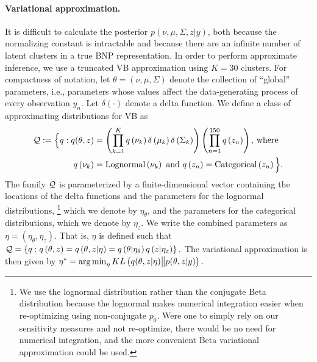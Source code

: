 %
\paragraph{Variational approximation.} It is difficult to calculate the
posterior $p\left(\nu, \mu, \Sigma, z \vert y\right)$, both because the
normalizing constant is intractable and because there are an infinite number of
latent clusters in a true BNP representation. In order to perform approximate
inference, we use a truncated VB approximation using $K=30$
clusters\citep{blei:2006:dirichletbnp}. For compactness of notation, let $\theta =
\left(\nu, \mu, \Sigma\right)$ denote the collection of ``global'' parameters,
i.e., parameters whose values affect the data-generating process of every
observation $y_n$.   Let $\delta\left(\cdot\right)$ denote a delta function. We
define a class of approximating distributions for VB as
%
\begin{align*}
\mathcal{Q} := \Big\{ q:
q(\theta, z) &=
\left(\prod_{k=1}^{K}q\left(\nu_{k}\right)\delta\left(\mu_{k}\right)
    \delta\left(\Sigma_{k}\right)\right)
    \left(\prod_{n=1}^{150}q\left(z_{n}\right) \right)\textrm{, where } \\
q\left(\nu_{k}\right) &= \mathrm{Lognormal}\left(\nu_k\right) \textrm{ and }
q\left(z_n\right) = \mathrm{Categorical}\left(z_n\right)
\Big\}.
\end{align*}
%
The family $\mathcal{Q}$ is parameterized by a finite-dimensional vector containing
the locations of the delta functions and the parameters for the lognormal
distributions,
%
\footnote{We use the lognormal distribution rather than the conjugate Beta
distribution because the lognormal makes numerical integration easier when
re-optimizing using non-conjugate $p_{0}$.  Were one to simply rely on our
sensitivity measures and not re-optimize, there would be no need for numerical
integration, and the more convenient Beta variational approximation could be
used.}
%
which we denote by $\eta_\theta$, and the parameters for the
categorical distributions, which we denote by $\eta_z$. We write the combined
parameters as $\eta=\left(\eta_\theta, \eta_z\right)$. That is, $\eta$ is
defined such that
%
$\mathcal{Q} =
    \left\{q: q\left(\theta, z\right) =
            q\left(\theta, z \vert \eta \right) =
            q\left(\theta \vert \eta_\theta \right)
            q\left(z \vert \eta_z \right)
    \right\}.$
%
The variational approximation is then given by
%
$
\etaopt = \argmin_{\eta} KL\left(
    q(\theta, z \vert \eta) \big\| p(\theta, z | y)
    \right). %
$

